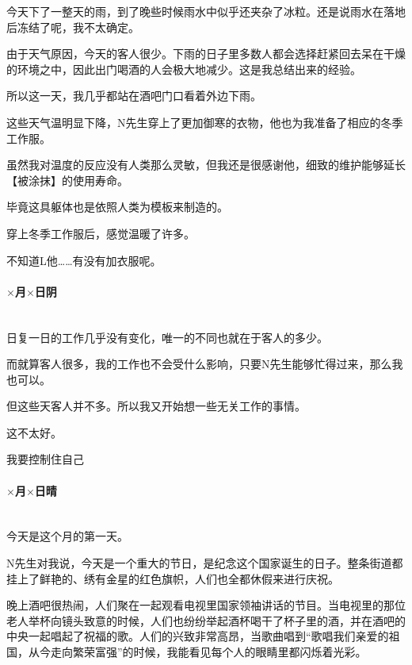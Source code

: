 今天下了一整天的雨，到了晚些时候雨水中似乎还夹杂了冰粒。还是说雨水在落地后冻结了呢，我不太确定。

由于天气原因，今天的客人很少。下雨的日子里多数人都会选择赶紧回去呆在干燥的环境之中，因此出门喝酒的人会极大地减少。这是我总结出来的经验。

所以这一天，我几乎都站在酒吧门口看着外边下雨。

这些天气温明显下降，N先生穿上了更加御寒的衣物，他也为我准备了相应的冬季工作服。

虽然我对温度的反应没有人类那么灵敏，但我还是很感谢他，细致的维护能够延长【被涂抹】的使用寿命。

毕竟这具躯体也是依照人类为模板来制造的。

穿上冬季工作服后，感觉温暖了许多。

不知道L他……有没有加衣服呢。

\par

\paragraph*{$\times$月$\times$日\quad 阴}\mbox{}\\

日复一日的工作几乎没有变化，唯一的不同也就在于客人的多少。

而就算客人很多，我的工作也不会受什么影响，只要N先生能够忙得过来，那么我也可以。

但这些天客人并不多。所以我又开始想一些无关工作的事情。

这不太好。

我要控制住自己

\par

\paragraph*{$\times$月$\times$日\quad 晴}\mbox{}\\

今天是这个月的第一天。

N先生对我说，今天是一个重大的节日，是纪念这个国家诞生的日子。整条街道都挂上了鲜艳的、绣有金星的红色旗帜，人们也全都休假来进行庆祝。

晚上酒吧很热闹，人们聚在一起观看电视里国家领袖讲话的节目。当电视里的那位老人举杯向镜头致意的时候，人们也纷纷举起酒杯喝干了杯子里的酒，并在酒吧的中央一起唱起了祝福的歌。人们的兴致非常高昂，当歌曲唱到“歌唱我们亲爱的祖国，从今走向繁荣富强”的时候，我能看见每个人的眼睛里都闪烁着光彩。

